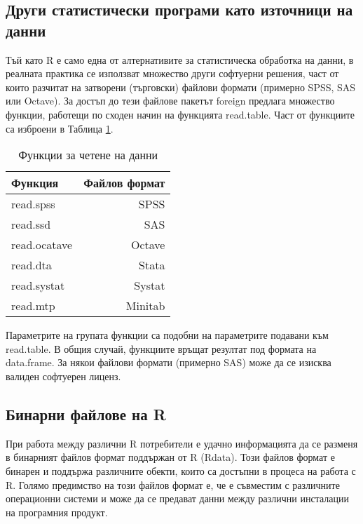 \subsection{Други статистически програми като източници на данни}

Тъй като R е само една от алтернативите за статистическа обработка на данни, в реалната практика се използват множество други софтуерни решения, част от които разчитат на затворени (търговски) файлови формати (примерно SPSS, SAS или Octave). За достъп до тези файлове пакетът foreign предлага множество функции, работещи по сходен начин на функцията read.table. Част от функциите са изброени в Таблица \ref{table0001}. 

\begin{table}[h!]
\centering
\begin{tabular}{|l|r|} 
  \rowcolor{lightgray}
  \hline
  Функция & Файлов формат \\ [0.1ex] 
  \hline\hline
  read.spss & SPSS \\
  \hline
  read.ssd & SAS \\
  \hline
  read.ocatave & Octave \\
  \hline
  read.dta & Stata \\
  \hline
  read.systat & Systat \\
  \hline
  read.mtp & Minitab \\
  \hline
\end{tabular}
\caption{Функции за четене на данни}
\label{table0001}
\end{table}

Параметрите на групата функции са подобни на параметрите подавани към read.table. В общия случай, функциите връщат резултат под формата на data.frame. За някои файлови формати (примерно SAS) може да се изисква валиден софтуерен лиценз. 

\subsection{Бинарни файлове на R}

При работа между различни R потребители е удачно информацията да се разменя в бинарният файлов формат поддържан от R (Rdata). Този файлов формат е бинарен и поддържа различните обекти, които са достъпни в процеса на работа с R. Голямо предимство на този файлов формат е, че е съвместим с различните операционни системи и може да се предават данни между различни инсталации на програмния продукт. 

